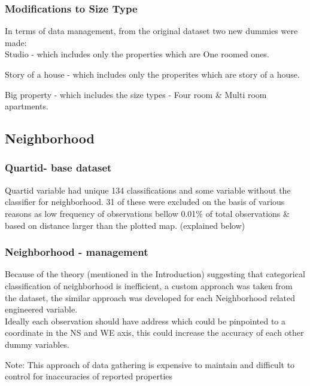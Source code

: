 \documentclass[]{article}
\begin{document}
\subsubsection{Modifications to Size Type}
In terms of data management, from the original dataset two new dummies were made:\\

Studio - which includes only the properties which are One roomed ones.

Story of a house - which includes only the properites which are story of a house.

Big property - which includes the size types - Four room \& Multi room apartments.


\subsection{Neighborhood}
\subsubsection{Quartid- base dataset}
Quartid  variable had unique 134 classifications and some variable without the classifier for neighborhood. 31 of these were excluded on the basis of various reasons as low frequency of observations bellow 0.01\% of total observations \& based on distance larger than the plotted map. (explained below)


\subsubsection{Neighborhood - management}
Because of the theory (mentioned in the Introduction) suggesting that categorical classification of neighborhood is inefficient, a custom approach was taken from the dataset, the similar approach was developed for each Neighborhood related engineered variable.\\
Ideally each observation should have address which could be pinpointed to a coordinate in the NS and WE axis, this could increase the accuracy of each other dummy variables.
\begin{center}
	\scriptsize
	Note: This approach of data gathering is expensive to maintain and difficult to control for inaccuracies of reported properties
\end{center} 
\end{document}
